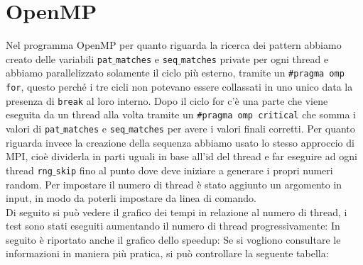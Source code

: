 \documentclass[12pt,openany]{report}
\begin{document}
\section{OpenMP}
Nel programma OpenMP per quanto riguarda la ricerca dei pattern abbiamo creato delle variabili \texttt{pat$\_$matches} e \texttt{seq$\_$matches} private per ogni thread e abbiamo parallelizzato solamente il ciclo più esterno, tramite un \texttt{\#pragma omp for}, questo perché i tre cicli non potevano essere collassati in uno unico data la presenza di \texttt{break} al loro interno. Dopo il ciclo for c'è una parte che viene eseguita da un thread alla volta tramite un \texttt{\#pragma omp critical} che somma i valori di \texttt{pat$\_$matches} e \texttt{seq$\_$matches} per avere i valori finali corretti. Per quanto riguarda invece la creazione della sequenza abbiamo usato lo stesso approccio di MPI, cioè dividerla in parti uguali in base all'id del thread e far eseguire ad ogni thread \texttt{rng$\_$skip} fino al punto dove deve iniziare a generare i propri numeri random. Per impostare il numero di thread è stato aggiunto un argomento in input, in modo da poterli impostare da linea di comando.\\
Di seguito si può vedere il grafico dei tempi in relazione al numero di thread, i test sono stati eseguiti aumentando il numero di thread progressivamente:
In seguito è riportato anche il grafico dello speedup:
Se si vogliono consultare le informazioni in maniera più pratica, si può controllare la seguente tabella:
\end{document}
